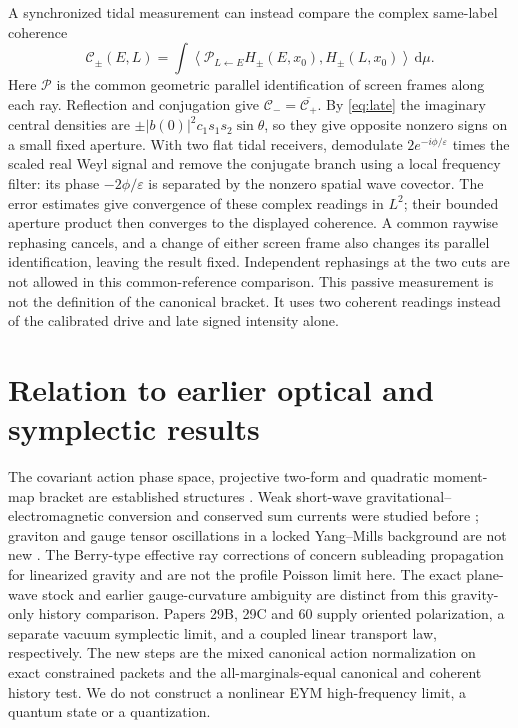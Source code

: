 \documentclass[11pt]{article}
\newcommand{\dd}{\mathrm d}
\newcommand{\eps}{\varepsilon}
\begin{document}
A synchronized tidal measurement can instead compare
the complex same-label coherence
\[
 \mathcal C_\pm(E,L)=\int
   \left\langle \mathcal P_{L\leftarrow E}H_\pm(E,x_0),
                         H_\pm(L,x_0)\right\rangle\,\dd\mu .
\]
Here \(\mathcal P\) is the common geometric parallel
identification of screen frames along each ray.
Reflection and conjugation give
\(\mathcal C_-=\overline{\mathcal C_+}\).
By \eqref{eq:late} the imaginary central densities
are \(\pm |b(0)|^2c_1s_1s_2\sin\theta\), so they
give opposite nonzero signs on a small fixed aperture.
With two flat tidal receivers, demodulate
\(2e^{-i\phi/\eps}\) times the scaled real Weyl signal
and remove the conjugate branch using a local
frequency filter: its phase \(-2\phi/\eps\) is
separated by the nonzero spatial wave covector.
The error estimates give convergence of these complex
readings in \(L^2\); their bounded aperture product
then converges to the displayed coherence.
A common raywise rephasing cancels, and a change
of either screen frame also changes its parallel
identification, leaving the result fixed. Independent
rephasings at the two cuts are not allowed in this
common-reference comparison. This passive
measurement is not the definition of the canonical
bracket. It uses two coherent readings instead of the
calibrated drive and late signed intensity alone.

\section{Relation to earlier optical and symplectic results}

The covariant action phase space, projective two-form
and quadratic moment-map bracket are established
structures \cite{leewald,ashtekar}. Weak short-wave
gravitational--electromagnetic conversion and conserved
sum currents were studied before \cite{tokuoka};
graviton and gauge tensor oscillations in a locked
Yang--Mills background are not new \cite{cdm}.
The Berry-type effective ray corrections of
\cite{anderson} concern subleading propagation for
linearized gravity and are not the profile Poisson
limit here. The exact plane-wave stock and earlier
gauge-curvature ambiguity \cite{coleman,guven,gst}
are distinct from this gravity-only history comparison.
Papers 29B, 29C and 60 supply oriented polarization,
a separate vacuum symplectic limit, and a coupled
linear transport law, respectively. The new steps
are the mixed canonical action normalization on exact
constrained packets and the all-marginals-equal
canonical and coherent history test. We do not
construct a nonlinear EYM high-frequency limit,
a quantum state or a quantization.
\end{document}

